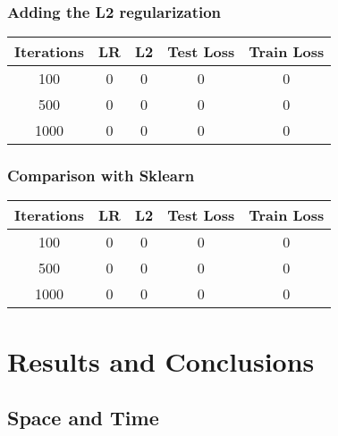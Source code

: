 \documentclass[
	letterpaper, %
	10pt, %
]{class}
\begin{document}
\subsubsection{Adding the L2 regularization}

\begin{center}
	\begin{tabular}{ |c|c|c|c|c| }
		\hline
		Iterations & LR & L2 & Test Loss & Train Loss \\
		\hline
		100        & 0  & 0  & 0         & 0          \\
		500        & 0  & 0  & 0         & 0          \\
		1000       & 0  & 0  & 0         & 0          \\
		\hline
	\end{tabular}
\end{center}

\subsubsection{Comparison with Sklearn}

\begin{center}
	\begin{tabular}{ |c|c|c|c|c| }
		\hline
		Iterations & LR & L2 & Test Loss & Train Loss \\
		\hline
		100        & 0  & 0  & 0         & 0          \\
		500        & 0  & 0  & 0         & 0          \\
		1000       & 0  & 0  & 0         & 0          \\
		\hline
	\end{tabular}
\end{center}



\section{Results and Conclusions}

\subsection{Space and Time}



\printbibliography %

\end{document}
